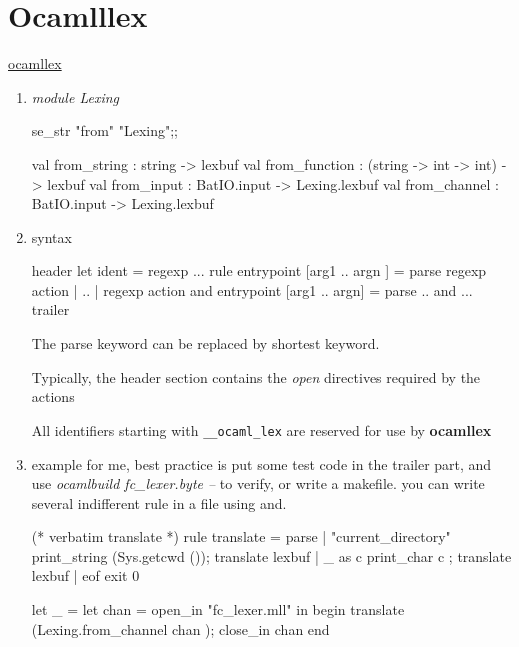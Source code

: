 \section{Ocamlllex}
\href{http://caml.inria.fr/pub/docs/manual-ocaml/manual026.html}{ocamllex}

\begin{enumerate}
\item \textit{module Lexing}
  \begin{ocamlcode}
    se_str "from" "Lexing";;
  \end{ocamlcode}
  
\begin{ocamlcode}  
  val from_string : string -> lexbuf
  val from_function : (string -> int -> int) -> lexbuf
  val from_input : BatIO.input -> Lexing.lexbuf
  val from_channel : BatIO.input -> Lexing.lexbuf    
\end{ocamlcode}

\item syntax \\

  \begin{bluetext}
    {header}
    let ident = regexp ...
    rule entrypoint [arg1 .. argn ] =
       parse regexp {action }
       | ..
       | regexp {action}
    and entrypoint [arg1 .. argn] =
       parse ..
    and ... 
    {trailer}
  \end{bluetext}

  The parse keyword can be replaced by shortest keyword.

  Typically, the header section contains the \textit{open} directives
  required by the actions

  All identifiers starting with \verb|__ocaml_lex| are reserved for use by
  \textbf{ocamllex}
\item example
  for me, best practice is put some test code in the trailer part, and
  use \textit{ocamlbuild fc\_lexer.byte --} to verify, or write a
  makefile. you can write several indifferent rule in a file using and.

  \begin{bluetext}

(* verbatim translate *)
rule translate = parse 
  | "current_directory" {print_string (Sys.getcwd ()); translate lexbuf}
  | _ as c {print_char c ; translate lexbuf}
  | eof {exit 0}

{
  let _ = 
    let chan = open_in "fc_lexer.mll" in begin
    translate (Lexing.from_channel chan ); 
    close_in chan 
    end 

}
\end{bluetext}
\end{enumerate}
